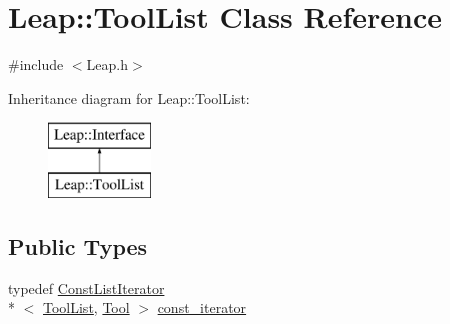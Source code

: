 \hypertarget{class_leap_1_1_tool_list}{\section{Leap\+:\+:Tool\+List Class Reference}
\label{class_leap_1_1_tool_list}
}


{\ttfamily \#include $<$Leap.\+h$>$}

Inheritance diagram for Leap\+:\+:Tool\+List\+:\begin{figure}[H]
\begin{center}
\leavevmode
\includegraphics[height=2.000000cm]{class_leap_1_1_tool_list}
\end{center}
\end{figure}
\subsection*{Public Types}
\begin{DoxyCompactItemize}
\item 
typedef \hyperlink{class_leap_1_1_const_list_iterator}{Const\+List\+Iterator}\\*
$<$ \hyperlink{class_leap_1_1_tool_list}{Tool\+List}, \hyperlink{class_leap_1_1_tool}{Tool} $>$ \hyperlink{class_leap_1_1_tool_list_a7f52ee5561016e8d42512e2adbc820de}{const\+\_\+iterator}
\end{DoxyCompactItemize}
